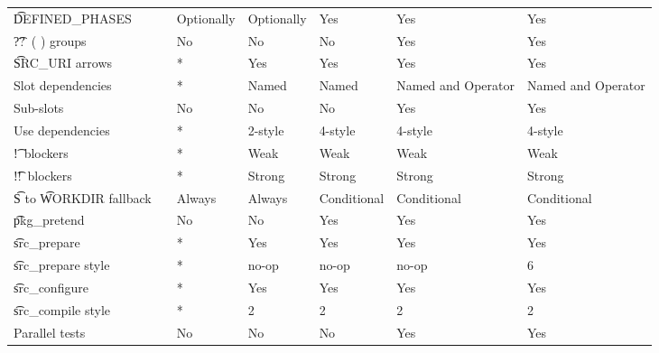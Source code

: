 \begin{landscape}
\begin{longtable}{llP{7.5em}P{7.5em}P{7.5em}P{7.5em}P{7.5em}}
\t{DEFINED\_PHASES} &  &
    Optionally & Optionally & Yes & Yes & Yes \\

\t{??\ ( )} groups &  &
    No & No & No & Yes & Yes \\

\t{SRC\_URI} arrows &  &
    * & Yes & Yes & Yes & Yes \\

Slot dependencies &  &
    * & Named & Named & Named and Operator & Named and Operator \\

Sub-slots &  &
    No & No & No & Yes & Yes \\

Use dependencies &  &
    * & 2-style & 4-style & 4-style & 4-style \\

\t{!}\ blockers &  &
    * & Weak & Weak & Weak & Weak \\

\t{!!}\ blockers &  &
    * & Strong & Strong & Strong & Strong \\

\t{S} to \t{WORKDIR} fallback &  &
    Always & Always & Conditional & Conditional & Conditional \\

\t{pkg\_pretend} &  &
    No & No & Yes & Yes & Yes \\

\t{src\_prepare} &  &
    * & Yes & Yes & Yes & Yes \\

\t{src\_prepare} style &  &
    * & no-op & no-op & no-op & 6 \\

\t{src\_configure} &  &
    * & Yes & Yes & Yes & Yes \\

\t{src\_compile} style &  &
    * & 2 & 2 & 2 & 2 \\

Parallel tests &  &
    No & No & No & Yes & Yes \\


\end{longtable}
\end{landscape}
